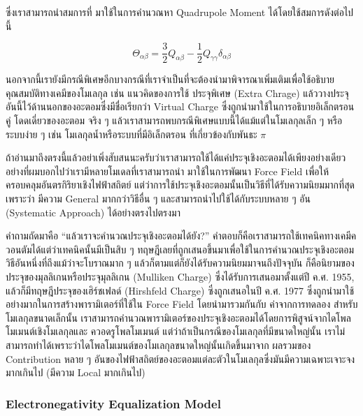\noindent ซึ่งเราสามารถนำสมการที่  มาใช้ในการคำนวณหา Quadrupole Moment ได้โดยใช้สมการดังต่อไปนี้

\begin{equation}
    \Theta_{\alpha \beta}
    =
    \frac{3}{2} Q_{\alpha \beta} - \frac{1}{2} Q_{\gamma \gamma} \delta_{\alpha \beta}
\end{equation}

นอกจากนี้เรายังมีกรณีพิเศษอีกบางกรณีที่เราจำเป็นที่จะต้องนำมาพิจารณาเพิ่มเติมเพื่อใช้อธิบายคุณสมบัติทางเคมีของโมเลกุล เช่น แนวคิดของการใช้%
ประจุพิเศษ (Extra Chrage) แล้ววางประจุอันนี้ไว้ด้านนอกของอะตอมซึ่งมีชื่อเรียกว่า Virtual Charge ซึ่งถูกนำมาใช้ในการอธิบายอิเล็กตรอนคู่%
โดดเดี่ยวของอะตอม จริง ๆ แล้วเราสามารถพบกรณีพิเศษแบบนี้ได้แม้แต่ในโมเลกุลเล็ก ๆ หรือระบบง่าย ๆ เช่น โมเลกุลน้ำหรือระบบที่มีอิเล็กตรอน%
ที่เกี่ยวข้องกับพันธะ $\pi$ 

ถ้าอ่านมาถึงตรงนี้แล้วอย่าเพิ่งสับสนนะครับว่าเราสามารถใช้ได้แค่ประจุเชิงอะตอมได้เพียงอย่างเดียว อย่างที่ผมบอกไปว่าเรามีหลายโมเดลที่เราสามารถนำ%
มาใช้ในการพัฒนา Force Field เพื่อให้ครอบคลุมอันตรกิริยาเชิงไฟฟ้าสถิตย์ แต่ว่าการใช้ประจุเชิงอะตอมนั้นเป็นวิธีที่ได้รับความนิยมมากที่สุดเพราะว่า%
มีความ General มากกว่าวิธีอื่น ๆ และสามารถนำไปใช้ได้กับระบบหลาย ๆ อัน (Systematic Approach) ได้อย่างตรงไปตรงมา

คำถามถัดมาคือ \enquote{แล้วเราจะคำนวณประจุเชิงอะตอมได้ยัง?} คำตอบก็คือเราสามารถใช้เทคนิคทางเคมีควอนตัมได้แต่ว่าเทคนิคนั้นมีเป็นสิบ ๆ 
ทฤษฎีเลยที่ถูกเสนอขึ้นมาเพื่อใช้ในการคำนวณประจุเชิงอะตอม วิธีอันหนึ่งที่ถึงแม้ว่าจะโบราณมาก ๆ แล้วก็ตามแต่ก็ยังได้รับความนิยมมาจนถึงปัจจุบัน%
ก็คือนิยามของประจุของมุลลิเกนหรือประจุมุลลิเกน (Mulliken Charge) ซึ่งได้รับการเสนอมาตั้งแต่ปี ค.ศ. 1955, แล้วก็มีทฤษฎีประจุของเฮิร์ชเฟลด์ 
(Hirshfeld Charge) ซึ่งถูกเสนอในปี ค.ศ. 1977 ซึ่งถูกนำมาใช้อย่างมากในการสร้างพารามิเตอร์ที่ใช้ใน Force Field โดยนำมารวมกันกับ%
ค่าจากการทดลอง สำหรับโมเลกุลขนาดเล็กนั้น เราสามารถคำนวณพารามิเตอร์ของประจุเชิงอะตอมได้โดยการพิสูจน์จากไดโพลโมเมนต์เชิงโมเลกุลและ%
ควอดรูโพลโมเมนต์ แต่ว่าถ้าเป็นกรณีของโมเลกุลที่มีขนาดใหญ่นั้น เราไม่สามารถทำได้เพราะว่าไดโพลโมเมนต์ของโมเลกุลขนาดใหญ่นั้นเกิดขึ้นมาจาก%
ผลรวมของ Contribution หลาย ๆ อันของไฟฟ้าสถิตย์ของอะตอมแต่ละตัวในโมเลกุลซึ่งมันมีความเฉพาะเจาะจงมากเกินไป (มีความ Local มากเกินไป)

\subsubsection{Electronegativity Equalization Model}

